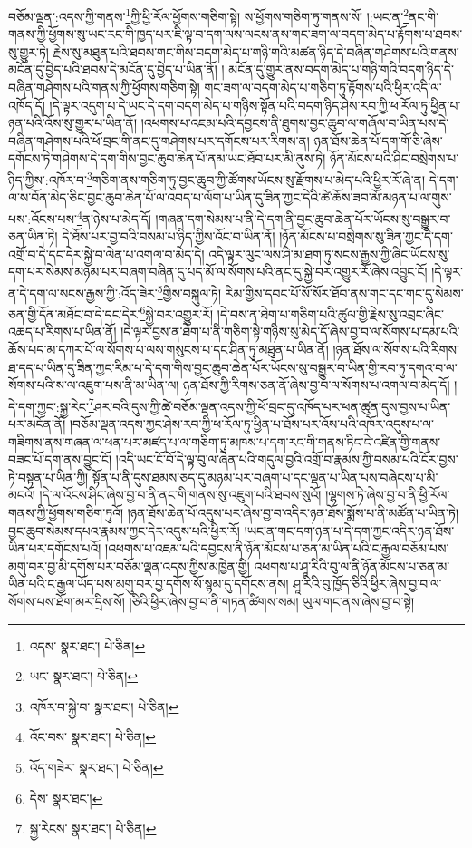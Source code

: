 བཅོམ་ལྡན་:འདས་ཀྱི་གནས་\footnote{འདས་  སྣར་ཐང་།  པེ་ཅིན། }ཀྱི་ཕྱི་རོལ་ཕྱོགས་གཅིག་སྟེ། ས་ཕྱོགས་གཅིག་ཏུ་གནས་སོ། །:ཡང་ན་\footnote{ཡང་  སྣར་ཐང་།  པེ་ཅིན། }ནང་གི་གནས་ཀྱི་ཕྱོགས་སུ་ཡང་རང་གི་ཁྱད་པར་ཇི་ལྟ་བ་དག་ལས་ལངས་ནས་གང་ཟག་ལ་བདག་མེད་པ་རྟོགས་པ་ཐབས་སུ་གྱུར་ཏེ། རྗེས་སུ་མཐུན་པའི་ཐབས་གང་གིས་བདག་མེད་པ་གཉི་གའི་མཚན་ཉིད་དེ་བཞིན་གཤེགས་པའི་གནས་མངོན་དུ་བྱེད་པའི་ཐབས་དེ་མངོན་དུ་བྱེད་པ་ཡིན་ནོ། །
མངོན་དུ་གྱུར་ནས་བདག་མེད་པ་གཉི་གའི་བདག་ཉིད་དེ་བཞིན་གཤེགས་པའི་གནས་ཀྱི་ཕྱོགས་གཅིག་སྟེ། གང་ཟག་ལ་བདག་མེད་པ་གཅིག་ཏུ་རྟོགས་པའི་ཕྱིར་འདི་ལ་འཁོད་དོ། །དེ་ལྟར་འདུག་པ་དེ་ཡང་དེ་དག་བདག་མེད་པ་གཉིས་སྟོན་པའི་བདག་ཉིད་ཤེས་རབ་ཀྱི་ཕ་རོལ་ཏུ་ཕྱིན་པ་ཉན་པའི་འོས་སུ་གྱུར་པ་ཡིན་ནོ། །འཕགས་པ་འཇམ་པའི་དབྱངས་ནི་ཐུགས་བྱང་ཆུབ་ལ་གཞོལ་བ་ཡིན་པས་དེ་བཞིན་གཤེགས་པའི་ཕོ་བྲང་གི་ནང་དུ་གཤེགས་པར་དགོངས་པར་རིགས་ན། ཉན་ཐོས་ཆེན་པོ་དག་གོ་ཅི་ཞེས་དགོངས་ཏེ་གཤེགས་དེ་དག་གིས་བྱང་ཆུབ་ཆེན་པོ་ནམ་ཡང་ཐོབ་པར་མི་ནུས་ཏེ། ཉོན་མོངས་པའི་ཤིང་བསྲེགས་པ་ཉིད་ཀྱིས་:འཁོར་བ་\footnote{འཁོར་བ་སྐྱེ་བ་  སྣར་ཐང་།  པེ་ཅིན། }གཅིག་ནས་གཅིག་ཏུ་བྱང་ཆུབ་ཀྱི་ཚོགས་ཡོངས་སུ་རྫོགས་པ་མེད་པའི་ཕྱིར་རོ་ཞེ་ན། དེ་དག་ལ་ས་བོན་མེད་ཅིང་བྱང་ཆུབ་ཆེན་པོ་ལ་འབད་པ་ལོག་པ་ཡིན་དུ་ཟིན་ཀྱང་དེའི་ཚེ་ཆོས་ཟབ་མོ་མཉན་པ་ལ་གུས་པས་:འོངས་པས་\footnote{འོང་བས་  སྣར་ཐང་།  པེ་ཅིན། }ན་ཉེས་པ་མེད་དོ། །གཞན་དག་སེམས་པ་ནི་དེ་དག་ནི་བྱང་ཆུབ་ཆེན་པོར་ཡོངས་སུ་བསྒྱུར་བ་ཅན་ཡིན་ཏེ། དེ་ཐོས་པར་བྱ་བའི་བསམ་པ་ཉིད་ཀྱིས་འོང་བ་ཡིན་ནོ། །ཉོན་མོངས་པ་བསྲེགས་སུ་ཟིན་ཀྱང་དེ་དག་འགྲོ་བ་དེ་དང་དེར་སྐྱེ་བ་ལེན་པ་འགལ་བ་མེད་དེ། འདི་ལྟར་ལུང་ལས་ཤི་མ་ཐག་ཏུ་སངས་རྒྱས་ཀྱི་ཞིང་ཡོངས་སུ་དག་པར་སེམས་མཉམ་པར་བཞག་བཞིན་དུ་པད་མོ་ལ་སོགས་པའི་ནང་དུ་སྐྱེ་བར་འགྱུར་རོ་ཞེས་འབྱུང་ངོ། །དེ་ལྟར་ན་དེ་དག་ལ་སངས་རྒྱས་ཀྱི་:འོད་ཟེར་\footnote{འོད་གཟེར་  སྣར་ཐང་།  པེ་ཅིན། }གྱིས་བསྐུལ་ཏེ། རིམ་གྱིས་དབང་པོ་སོ་སོར་ཐོབ་ནས་གང་དང་གང་དུ་སེམས་ཅན་གྱི་དོན་མཐོང་བ་དེ་དང་དེར་\footnote{དེས་  སྣར་ཐང་། }སྐྱེ་བར་འགྱུར་རོ། །དེ་བས་ན་ཐེག་པ་གཅིག་པའི་ཚུལ་གྱི་རྗེས་སུ་འབྲང་ཞིང་འཆད་པ་རིགས་པ་ཡིན་ནོ། །དེ་ལྟར་བྱས་ན་ཐེག་པ་ནི་གཅིག་སྟེ་གཉིས་སུ་མེད་དོ་ཞེས་བྱ་བ་ལ་སོགས་པ་དམ་པའི་ཆོས་པད་མ་དཀར་པོ་ལ་སོགས་པ་ལས་གསུངས་པ་དང་ཤིན་ཏུ་མཐུན་པ་ཡིན་ནོ། །ཉན་ཐོས་ལ་སོགས་པའི་རིགས་ཐ་དད་པ་ཡིན་དུ་ཟིན་ཀྱང་རིམ་པ་དེ་དག་གིས་བྱང་ཆུབ་ཆེན་པོར་ཡོངས་སུ་བསྒྱུར་བ་ཡིན་གྱི་རབ་ཏུ་དགའ་བ་ལ་སོགས་པའི་ས་ལ་འཇུག་པས་ནི་མ་ཡིན་ལ། ཉན་ཐོས་ཀྱི་རིགས་ཅན་ནོ་ཞེས་བྱ་བ་ལ་སོགས་པ་འགལ་བ་མེད་དོ། །དེ་དག་ཀྱང་:སྐྱ་རེང་\footnote{སྐྱ་རེངས་  སྣར་ཐང་།  པེ་ཅིན། }ཤར་བའི་དུས་ཀྱི་ཚེ་བཅོམ་ལྡན་འདས་ཀྱི་ཕོ་བྲང་དུ་འཁོད་པར་ཕན་ཚུན་དུས་བྱས་པ་ཡིན་པར་མངོན་ནོ། །བཅོམ་ལྡན་འདས་ཀྱང་ཤེས་རབ་ཀྱི་ཕ་རོལ་ཏུ་ཕྱིན་པ་ཐོས་པར་འོས་པའི་འཁོར་འདུས་པ་ལ་གཟིགས་ནས་གཞན་ལ་ཕན་པར་མཛད་པ་ལ་གཅིག་ཏུ་མཁས་པ་དག་རང་གི་གནས་ཏིང་ངེ་འཛིན་གྱི་གནས་བཟང་པོ་དག་ནས་བྱུང་ངོ། །འདི་ཡང་ངོ་བོ་དེ་ལྟ་བུ་ལ་ཞེན་པའི་གདུལ་བྱའི་འགྲོ་བ་རྣམས་ཀྱི་བསམ་པའི་ངོར་བྱས་ཏེ་བསྟན་པ་ཡིན་ཀྱི། སྟོན་པ་ནི་དུས་ཐམས་ཅད་དུ་མཉམ་པར་བཞག་པ་དང་ལྡན་པ་ཡིན་པས་བཞེངས་པ་མི་མངའོ། །དེ་ལ་འོངས་ཤིང་ཞེས་བྱ་བ་ནི་ནང་གི་གནས་སུ་འཇུག་པའི་ཐབས་སུའོ། །ལྷགས་ཏེ་ཞེས་བྱ་བ་ནི་ཕྱི་རོལ་གནས་ཀྱི་ཕྱོགས་གཅིག་ཏུའོ། །ཉན་ཐོས་ཆེན་པོ་འདུས་པར་ཞེས་བྱ་བ་འདིར་ཉན་ཐོས་སྨོས་པ་ནི་མཚོན་པ་ཡིན་ཏེ། བྱང་ཆུབ་སེམས་དཔའ་རྣམས་ཀྱང་དེར་འདུས་པའི་ཕྱིར་རོ། །ཡང་ན་གང་དག་ཉན་པ་དེ་དག་ཀྱང་འདིར་ཉན་ཐོས་ཡིན་པར་དགོངས་པའོ། །འཕགས་པ་འཇམ་པའི་དབྱངས་ནི་ཉོན་མོངས་པ་ཅན་མ་ཡིན་པའི་ང་རྒྱལ་བཅོམ་པས་མགུ་བར་བྱ་མི་དགོས་པར་བཅོམ་ལྡན་འདས་ཀྱིས་མཁྱེན་གྱི། འཕགས་པ་ཤཱ་རིའི་བུ་ལ་ནི་ཉོན་མོངས་པ་ཅན་མ་ཡིན་པའི་ང་རྒྱལ་ཡོད་པས་མགུ་བར་བྱ་དགོས་སོ་སྙམ་དུ་དགོངས་ནས། ཤཱ་རིའི་བུ་ཁྱོད་ཅིའི་ཕྱིར་ཞེས་བྱ་བ་ལ་སོགས་པས་ཐོག་མར་དྲིས་སོ། །ཅིའི་ཕྱིར་ཞེས་བྱ་བ་ནི་གཏན་ཚིགས་སམ། ཡུལ་གང་ནས་ཞེས་བྱ་བ་སྟེ། 